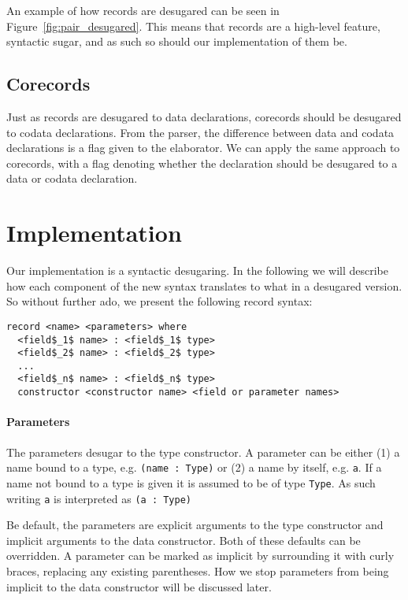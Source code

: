 An example of how records are desugared can be seen in
Figure~\ref{fig:pair_desugared}. This means that records are a high-level feature, syntactic sugar, and
as such so should our implementation of them be.

\subsection{Corecords}
Just as records are desugared to data declarations, corecords should be
desugared to codata declarations. From the parser, the difference between data and
codata declarations is a flag given to the elaborator. We can apply the same
approach to corecords, with a flag denoting whether the declaration should be
desugared to a data or codata declaration. 

\section{Implementation}
Our implementation is a syntactic desugaring. In the following we will describe
how each component of the new syntax translates to what in a desugared
version. So without further ado, we present the following record syntax: 

\begin{lstlisting}[mathescape]
record <name> <parameters> where
  <field$_1$ name> : <field$_1$ type>
  <field$_2$ name> : <field$_2$ type>
  ...
  <field$_n$ name> : <field$_n$ type>
  constructor <constructor name> <field or parameter names>
\end{lstlisting}

\paragraph{Parameters}
The parameters desugar to the type constructor. A parameter can be either (1) a
name bound to a type, e.g. \texttt{(name : Type)} or (2) a name by itself,
e.g. \texttt{a}. If a name not bound to a type is given it is assumed to be of type
\texttt{Type}. As such writing \texttt{a} is interpreted as \texttt{(a : Type)}

Be default, the parameters are explicit arguments to the type
constructor and implicit arguments to the data constructor. Both of these
defaults can be overridden. A parameter can be marked as implicit by
surrounding it with curly braces, replacing any existing parentheses. How we
stop parameters from being implicit to the data constructor will be discussed later.

